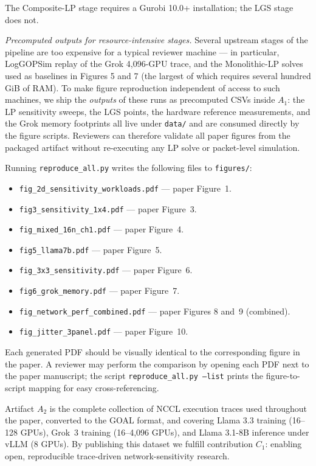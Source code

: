 \documentclass[conference]{IEEEtran}
\begin{document}
The Composite-LP stage requires a Gurobi 10.0+ installation; the
LGS stage does not.

\emph{Precomputed outputs for resource-intensive stages.} Several
upstream stages of the pipeline are too expensive for a typical
reviewer machine --- in particular, LogGOPSim replay of the Grok
4{,}096-GPU trace, and the Monolithic-LP solves used as baselines
in Figures 5 and 7 (the largest of which requires several hundred
GiB of RAM). To make figure reproduction independent of access to
such machines, we ship the \emph{outputs} of these runs as
precomputed CSVs inside $A_1$: the LP sensitivity sweeps, the LGS
points, the hardware reference measurements, and the Grok memory
footprints all live under \texttt{data/} and are consumed directly
by the figure scripts. Reviewers can therefore validate all paper
figures from the packaged artifact without re-executing any LP
solve or packet-level simulation.

\artout

Running \texttt{reproduce\_all.py} writes the following files to
\texttt{figures/}:

\begin{itemize}
\item \texttt{fig\_2d\_sensitivity\_workloads.pdf} --- paper Figure~1.
\item \texttt{fig3\_sensitivity\_1x4.pdf} --- paper Figure~3.
\item \texttt{fig\_mixed\_16n\_ch1.pdf} --- paper Figure~4.
\item \texttt{fig5\_llama7b.pdf} --- paper Figure~5.
\item \texttt{fig\_3x3\_sensitivity.pdf} --- paper Figure~6.
\item \texttt{fig6\_grok\_memory.pdf} --- paper Figure~7.
\item \texttt{fig\_network\_perf\_combined.pdf} --- paper Figures 8 and~9 (combined).
\item \texttt{fig\_jitter\_3panel.pdf} --- paper Figure~10.
\end{itemize}

Each generated PDF should be visually identical to the corresponding
figure in the paper. A reviewer may perform the comparison by
opening each PDF next to the paper manuscript; the script
\texttt{reproduce\_all.py --list} prints the figure-to-script mapping
for easy cross-referencing.

\newartifact

\artrel

Artifact $A_2$ is the complete collection of NCCL execution traces
used throughout the paper, converted to the GOAL format, and
covering Llama 3.3 training (16--128 GPUs), Grok~3 training
(16--4{,}096 GPUs), and Llama 3.1-8B inference under vLLM (8 GPUs). By
publishing this dataset we fulfill contribution $C_1$: enabling
open, reproducible trace-driven network-sensitivity research.
\end{document}
